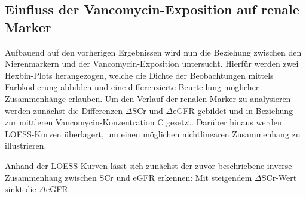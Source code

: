 \documentclass[a4paper,12pt]{article}
\begin{document}
\subsection{Einfluss der Vancomycin-Exposition auf renale Marker}\label{sec:ZmVE}

Aufbauend auf den vorherigen Ergebnissen wird nun die Beziehung zwischen den Nierenmarkern und der Vancomycin-Exposition untersucht. Hierfür werden zwei Hexbin-Plots herangezogen, welche die Dichte der Beobachtungen mittels Farbkodierung abbilden und eine differenzierte Beurteilung möglicher Zusammenhänge erlauben. Um den Verlauf der renalen Marker zu analysieren werden zunächst die Differenzen $\Delta$SCr und $\Delta$eGFR gebildet und in Beziehung zur mittleren Vancomycin-Konzentration $\bar{\mathrm{C}}$ gesetzt. Darüber hinaus werden LOESS-Kurven überlagert, um einen möglichen nichtlinearen Zusammenhang zu illustrieren. 


Anhand der LOESS-Kurven lässt sich zunächst der zuvor beschriebene inverse Zusammenhang zwischen SCr und eGFR erkennen: Mit steigendem $\Delta$SCr-Wert sinkt die $\Delta$eGFR. 
\end{document}
